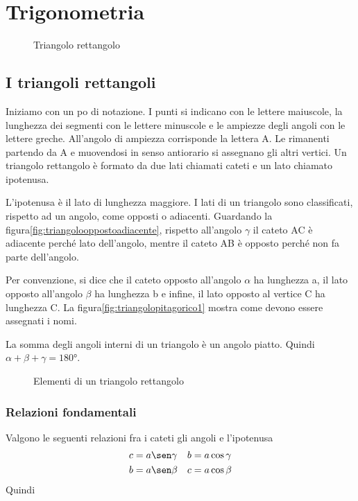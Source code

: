 \chapter{Trigonometria}
\label{cha:trigonometria}
\minitoc
\mtcskip                                %
\minilof                                %
\mtcskip                                %
\minilot
\begin{figure}
	\centering
	
	\caption{Triangolo rettangolo}
	\label{fig:triangolopitagorico1}
\end{figure}
\section{I triangoli rettangoli}
Iniziamo con un po di notazione. I punti si indicano con le lettere maiuscole, la lunghezza dei segmenti con le lettere minuscole e le ampiezze degli angoli con le lettere greche. All'angolo di ampiezza corrisponde la lettera A. Le rimanenti partendo da A e muovendosi in senso antiorario si assegnano gli altri vertici. Un triangolo rettangolo è formato da due lati chiamati cateti e un lato chiamato ipotenusa.

 L'ipotenusa è il lato di lunghezza maggiore. I lati di un triangolo sono classificati, rispetto ad un angolo, come opposti o adiacenti. Guardando la figura\nobs\vref{fig:triangolooppostoadiacente}, rispetto all'angolo $\gamma$ il cateto AC è adiacente perché lato dell'angolo, mentre il cateto AB è opposto perché non fa parte dell'angolo. 
 
 Per convenzione, si dice che il cateto opposto all'angolo $\alpha$ ha lunghezza a, il lato opposto all'angolo $\beta$ ha lunghezza b e infine, il lato opposto al vertice C ha lunghezza C. La figura\nobs\vref{fig:triangolopitagorico1} mostra come devono essere assegnati i nomi.
 
 La somma degli angoli interni di un triangolo è un angolo piatto. Quindi $\alpha+\beta+\gamma=\ang{180}$. 
\begin{figure}
	\centering
	
	\caption{Elementi di un triangolo rettangolo}
	\label{fig:triangolooppostoadiacente}
\end{figure}
\subsection{Relazioni fondamentali}
Valgono le seguenti relazioni fra i cateti gli angoli e l'ipotenusa
\begin{align*}
c&=a\sen\gamma&b&=a\cos\gamma\\
b&=a\sen\beta&c&=a\cos\beta
\end{align*}
Quindi

